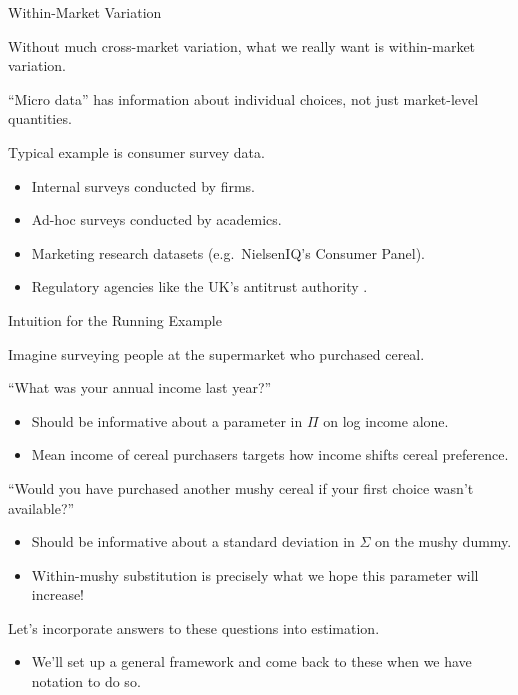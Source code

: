 \documentclass[aspectratio=169,t,11pt,table]{beamer}
\begin{document}
\begin{frame}{Within-Market Variation}
    \begin{wideitemize}
        \item Without much cross-market variation, what we really want is within-market variation.
        \pause
        \item ``Micro data'' has information about \alert{individual choices}, not just market-level quantities.
        \pause
        \item Typical example is consumer survey data.
        \begin{itemize}
            \item Internal surveys conducted by firms.
            \item Ad-hoc surveys conducted by academics.
            \item Marketing research datasets (e.g.\ NielsenIQ's Consumer Panel).
            \item Regulatory agencies like the UK's antitrust authority \citep{reynolds2008use}.
        \end{itemize}
    \end{wideitemize}
\end{frame}

\begin{frame}{Intuition for the Running Example}
    \begin{wideitemize}
        \item Imagine surveying people at the supermarket who purchased cereal.
        \pause
        \item \alert{``What was your annual income last year?''}
        \begin{itemize}
            \item Should be informative about a parameter in $\Pi$ on log income alone.
            \item Mean income of cereal purchasers targets how income shifts cereal preference.
        \end{itemize}
        \pause
        \item \alert{``Would you have purchased another mushy cereal if your first choice wasn't available?''}
        \begin{itemize}
            \item Should be informative about a standard deviation in $\Sigma$ on the mushy dummy.
            \item Within-mushy substitution is precisely what we hope this parameter will increase!
        \end{itemize}
        \pause
        \item Let's incorporate answers to these questions into estimation.
        \begin{itemize}
            \item We'll set up a general framework and come back to these when we have notation to do so. 
        \end{itemize}
    \end{wideitemize}
\end{frame}
\end{document}
